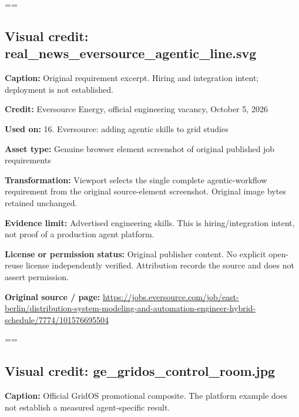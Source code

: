 \documentclass[10pt,letterpaper]{article}
\begin{document}
\egroup\par\noindent\box\readingEntry\par\medskip
\setbox\readingEntry=\vbox\bgroup\hsize=\linewidth\subsection*{Visual credit: real\_news\_eversource\_agentic\_line.svg}
\textbf{Caption:} Original requirement excerpt. Hiring and integration intent; deployment is not established.\par
\textbf{Credit:} Eversource Energy, official engineering vacancy, October 5, 2026\par
\textbf{Used on:} 16. Eversource: adding agentic skills to grid studies\par
\textbf{Asset type:} Genuine browser element screenshot of original published job requirements\par
\textbf{Transformation:} Viewport selects the single complete agentic-workflow requirement from the original source-element screenshot. Original image bytes retained unchanged.\par
\textbf{Evidence limit:} Advertised engineering skills. This is hiring/integration intent, not proof of a production agent platform.\par
\textbf{License or permission status:} Original publisher content. No explicit open-reuse license independently verified. Attribution records the source and does not assert permission.\par
\textbf{Original source / page:} \href{https://jobs.eversource.com/job/east-berlin/distribution-system-modeling-and-automation-engineer-hybrid-schedule/7774/101576695504}{\small\ttfamily https:/\allowbreak{}/\allowbreak{}jobs.\allowbreak{}eversource.\allowbreak{}com/\allowbreak{}job/\allowbreak{}east-\allowbreak{}berlin/\allowbreak{}distribution-\allowbreak{}system-\allowbreak{}modeling-\allowbreak{}and-\allowbreak{}automation-\allowbreak{}engineer-\allowbreak{}hybrid-\allowbreak{}schedule/\allowbreak{}7774/\allowbreak{}101576695504}\par
\egroup\par\noindent\box\readingEntry\par\medskip
\setbox\readingEntry=\vbox\bgroup\hsize=\linewidth\subsection*{Visual credit: ge\_gridos\_control\_room.jpg}
\textbf{Caption:} Official GridOS promotional composite. The platform example does not establish a measured agent-specific result.\par
\end{document}
